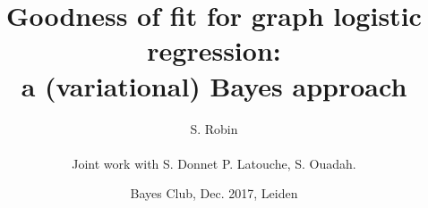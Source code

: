 \documentclass[10pt]{beamer}
\newcommand{\fignet}{/home/robin/RECHERCHE/RESEAUX/EXPOSES/FIGURES}
\begin{document}

\title[Bayesian GOF for logistic graphs]{Goodness of fit for graph logistic regression: \\
  a (variational) Bayes approach}

\author[S. Robin]{S. Robin \\ ~\\
  Joint work with S. Donnet P. Latouche, S. Ouadah.
  }


\date[Dec. 2017, Leiden]{Bayes Club, Dec. 2017, Leiden}

\maketitle

\end{document}
